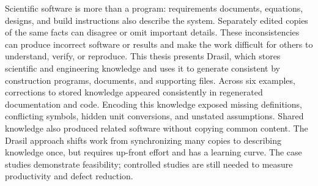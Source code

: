 
Scientific software is more than a program: requirements documents,
equations, designs, and build instructions also describe the system. Separately
edited copies of the same facts can disagree or omit important details. These
inconsistencies can produce incorrect software or results and make the work
difficult for others to understand, verify, or reproduce. This thesis presents
Drasil, which stores scientific and engineering knowledge and uses it to
generate consistent by construction programs, documents, and supporting files. 
Across six examples,
corrections to stored knowledge appeared consistently in regenerated
documentation and code. Encoding this knowledge exposed missing definitions,
conflicting symbols, hidden unit conversions, and unstated assumptions. Shared
knowledge also produced related software without copying common content. The
Drasil approach shifts work from synchronizing many copies to describing
knowledge once, but requires up-front effort and has a learning curve. The case
studies demonstrate feasibility; controlled studies are still needed to measure
productivity and defect reduction.
